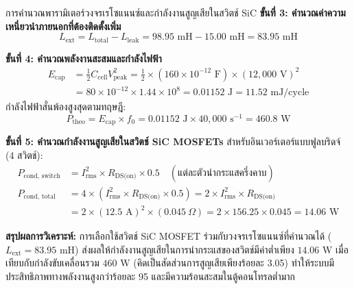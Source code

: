 \begin{examplebox}{การคำนวณพารามิเตอร์วงจรเรโซแนนซ์และกำลังงานสูญเสียในสวิตช์ SiC}
\textbf{ขั้นที่ 3: คำนวณค่าความเหนี่ยวนำภายนอกที่ต้องติดตั้งเพิ่ม}
\begin{equation*}
    L_{\text{ext}} = L_{\text{total}} - L_{\text{leak}} = 98.95 \text{ mH} - 15.00 \text{ mH} = 83.95 \text{ mH}
\end{equation*}

\textbf{ขั้นที่ 4: คำนวณพลังงานสะสมและกำลังไฟฟ้า}
\begin{align*}
    E_{\text{cap}} &= \frac{1}{2} C_{\text{cell}} V_{\text{peak}}^2 = \frac{1}{2} \times (160 \times 10^{-12} \text{ F}) \times (12,000 \text{ V})^2 \\
    &= 80 \times 10^{-12} \times 1.44 \times 10^8 = 0.01152 \text{ J} = 11.52 \text{ mJ/cycle}
\end{align*}
กำลังไฟฟ้าสั่นพ้องสูงสุดตามทฤษฎี:
\begin{equation*}
    P_{\text{theo}} = E_{\text{cap}} \times f_0 = 0.01152 \text{ J} \times 40,000 \text{ s}^{-1} = 460.8 \text{ W}
\end{equation*}

\textbf{ขั้นที่ 5: คำนวณกำลังงานสูญเสียในสวิตช์ SiC MOSFETs}
สำหรับอินเวอร์เตอร์แบบฟูลบริดจ์ (4 สวิตช์):
\begin{align*}
    P_{\text{cond, switch}} &= I_{\text{rms}}^2 \times R_{\text{DS(on)}} \times 0.5 \quad (\text{แต่ละตัวนำกระแสครึ่งคาบ}) \\
    P_{\text{cond, total}} &= 4 \times \left( I_{\text{rms}}^2 \times R_{\text{DS(on)}} \times 0.5 \right) = 2 \times I_{\text{rms}}^2 \times R_{\text{DS(on)}} \\
    &= 2 \times (12.5 \text{ A})^2 \times (0.045 \ \Omega) = 2 \times 156.25 \times 0.045 = 14.06 \text{ W}
\end{align*}

\textbf{สรุปผลการวิเคราะห์:} การเลือกใช้สวิตช์ SiC MOSFET ร่วมกับวงจรเรโซแนนซ์ที่คำนวณได้ ($L_{\text{ext}} = 83.95 \text{ mH}$) ส่งผลให้กำลังงานสูญเสียในการนำกระแสของสวิตช์มีค่าต่ำเพียง $14.06 \text{ W}$ เมื่อเทียบกับกำลังขับเคลื่อนรวม $460 \text{ W}$ (คิดเป็นสัดส่วนการสูญเสียเพียงร้อยละ 3.05) ทำให้ระบบมีประสิทธิภาพทางพลังงานสูงกว่าร้อยละ 95 และมีความร้อนสะสมในตู้คอนโทรลต่ำมาก
\end{examplebox}

